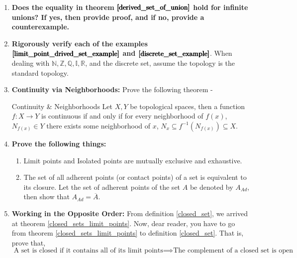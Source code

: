 \begin{enumerate}[label=\textbf{\arabic*.}]
    \item \textbf{Does the equality in theorem $\pmb{\eqref{derived_set_of_union}}$ hold for infinite unions? If yes, then provide proof, and if no, provide a counterexample.} 
    \item \textbf{Rigorously verify each of the examples $\pmb{\eqref{limit_point_drived_set_example}}$ and $\pmb{\eqref{discrete_set_example}}$}. When dealing with $\mathbb{ N, Z, Q, I, R}$, and the discrete set, assume the topology is the standard topology.
    \item \textbf{Continuity via Neighborhoods:} Prove the following theorem -
    \begin{Theorem}{Continuity \& Neighborhoods}\label{continuity_neighborhood}
        Let $X, Y$ be topological spaces, then a function $f:X \rightarrow Y$ is continuous if and only if for every neighborhood of $f(x)$, $N_{f(x)}\in Y$ there exists some neighborhood of $x$, $N_x\subseteq f^{-1}(N_{f(x)})\subseteq X$.
    \end{Theorem}
    \item \textbf{Prove the following things:}
    \begin{enumerate}
        \item Limit points and Isolated points are mutually exclusive and exhaustive. 
        \item The set of all adherent points (or contact points) of a set is equivalent to its closure. Let the set of adherent points of the set $A$ be denoted by $A_{Ad}$, then show that $A_{Ad}=\overline{A}$.
    \end{enumerate}
    \item \textbf{Working in the Opposite Order:} From definition \eqref{closed_set}, we arrived at theorem \eqref{closed_sets_limit_points}. Now, dear reader, you have to go from theorem \eqref{closed_sets_limit_points} to definition \eqref{closed_set}. That is, prove that,
    $$\boxed{\text{A set is closed if it contains all of its limit points}\implies\text{The complement of a closed set is open}}$$
\end{enumerate}

